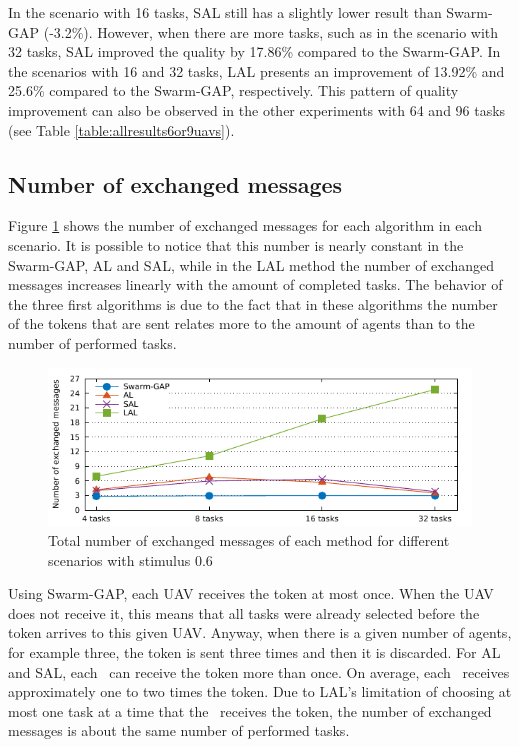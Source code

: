 In the scenario with 16 tasks, SAL still has a slightly lower result than Swarm-GAP (-3.2\%). However, when there are more tasks, such as in the scenario with 32 tasks, SAL improved the quality by 17.86\% compared to the Swarm-GAP. In the scenarios with 16 and 32 tasks, LAL presents an improvement of 13.92\% and 25.6\% compared to the Swarm-GAP, respectively. This pattern of quality improvement can also be observed in the other experiments 
with 64 and 96 tasks (see Table \ref{table:allresults6or9uavs}).

\subsection{Number of exchanged messages}

Figure \ref{grafico:trocamensagens} shows the number of exchanged messages for each algorithm in each scenario.
It is possible to notice that this number is nearly constant in the Swarm-GAP, AL and SAL, while in the LAL method the number of exchanged messages increases linearly with the amount of completed tasks. 
The behavior of  the three first algorithms is due to the fact that in these algorithms the number of the tokens that are sent relates more to the amount of agents than to the number of performed tasks.

%
\begin{figure}[h!]
	\begin{center}
		\includegraphics[scale=1.00]{exchanged_messages.pdf}
		\caption{Total number of exchanged messages of each method for different scenarios  with stimulus 0.6}
		\label{grafico:trocamensagens}
	\end{center}
\end{figure}

Using Swarm-GAP, each UAV receives the token at most once. When the UAV does not receive it, this means that all tasks were already selected before the token arrives to this given UAV. Anyway, when there is a given number of agents, for example three, the token is sent three times and then it is discarded. For AL and SAL, each \uav\ can receive the token more than once. On average, each \uav\ receives approximately one to two times the token.
Due to LAL's limitation of choosing at most one task at a time that the \uav\ receives the token, 
the number of exchanged messages is about the same number of performed tasks.

